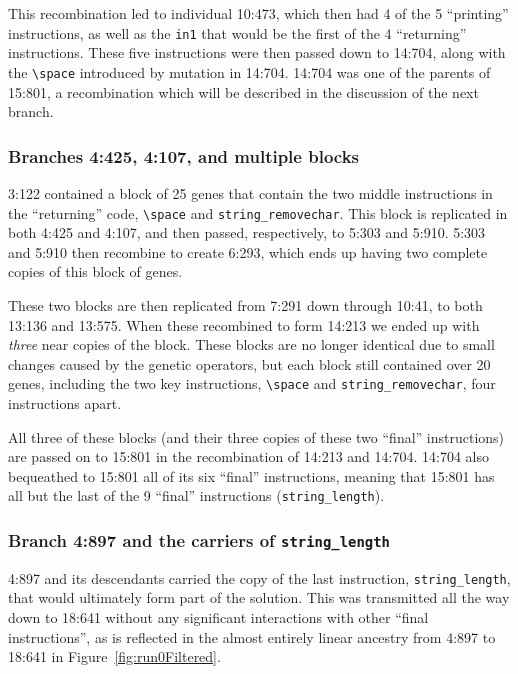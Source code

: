 This recombination
led to individual 10:473, which then had 4 of the 5 ``printing'' instructions,
as well as the \texttt{in1} that would be the first of the 4 ``returning''
instructions. These five instructions were then passed down to 14:704, 
along with the 
\texttt{\textbackslash space} introduced by mutation in 14:704. 14:704 was
one of the parents of 15:801, a recombination which will be described in the
discussion of the next branch.

\subsubsection{Branches 4:425, 4:107, and multiple blocks}
\label{sec:4:425}

3:122 contained a block of 25 genes %
that contain the two middle instructions in the ``returning''
code, \texttt{\textbackslash space} and \texttt{string\_removechar}.
This block is replicated in both 4:425 and 4:107, and then passed,
respectively, to 5:303 and 5:910. 5:303 and 5:910 then recombine
to create 6:293, which ends up having two complete copies of this
block of genes. %

These two blocks are then replicated from 7:291 down through 10:41,
to both 13:136 and 13:575. When these recombined to form 14:213
we ended up with \emph{three} near copies of the block. These blocks
are no longer identical due to small changes caused by the
genetic operators, but each block still contained over 20 genes,
including the two key instructions,
\texttt{\textbackslash space} and \texttt{string\_removechar},
four instructions apart.

All three of these blocks (and their three copies of these two ``final''
instructions) are passed on to 15:801 in the recombination of 14:213 and
14:704. 14:704 also bequeathed to 15:801 all of its six ``final'' 
instructions, meaning that 15:801 has all but the last of the 9 ``final''
instructions (\texttt{string\_length}).

\subsubsection{Branch 4:897 and the carriers of \texttt{string\_length}}
\label{sec:4:897}

4:897 and its descendants carried the copy of the last instruction, 
\texttt{string\_length}, that would ultimately form part of the solution. 
This was transmitted all the way down to
18:641 without any significant interactions with other ``final instructions'',
as is reflected in the almost entirely linear ancestry from 4:897 to 18:641 
in Figure~\ref{fig:run0Filtered}.

